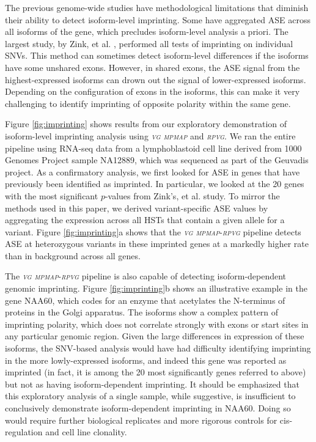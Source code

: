 \documentclass[11pt]{ucthesis}
\newcommand{\tool}[1]{\emph{\textsc{#1}}}
\begin{document}
The previous genome-wide studies have methodological limitations that diminish their ability to detect isoform-level imprinting. Some have aggregated ASE across all isoforms of the gene, which precludes isoform-level analysis a priori\cite{baran2015landscape,babak2015genetic,jadhav2019rna}. The largest study, by Zink, et al. \cite{zink2018insights}, performed all tests of imprinting on individual SNVs. This method can sometimes detect isoform-level differences if the isoforms have some unshared exons. However, in shared exons, the ASE signal from the highest-expressed isoforms can drown out the signal of lower-expressed isoforms. Depending on the configuration of exons in the isoforms, this can make it very challenging to identify imprinting of opposite polarity within the same gene.

Figure \ref{fig:imprinting} shows results from our exploratory demonstration of isoform-level imprinting analysis using \tool{vg mpmap} and \tool{rpvg}. We ran the entire pipeline using RNA-seq data from a lymphoblastoid cell line derived from 1000 Genomes Project sample NA12889, which was sequenced as part of the Geuvadis project\cite{lappalainen2013transcriptome}. As a confirmatory analysis, we first looked for ASE in genes that have previously been identified as imprinted. In particular, we looked at the 20 genes with the most significant $p$-values from Zink's, et al. study\cite{zink2018insights}. To mirror the methods used in this paper, we derived variant-specific ASE values by aggregating the expression across all HSTs that contain a given allele for a variant. Figure \ref{fig:imprinting}a shows that the \tool{vg mpmap}-\tool{rpvg} pipeline detects ASE at heterozygous variants in these imprinted genes at a markedly higher rate than in background across all genes.

The \tool{vg mpmap}-\tool{rpvg} pipeline is also capable of detecting isoform-dependent genomic imprinting. Figure \ref{fig:imprinting}b shows an illustrative example in the gene NAA60, which codes for an enzyme that acetylates the N-terminus of proteins in the Golgi apparatus. The isoforms show a complex pattern of imprinting polarity, which does not correlate strongly with exons or start sites in any particular genomic region. Given the large differences in expression of these isoforms, the SNV-based analysis would have had difficulty identifying imprinting in the more lowly-expressed isoforms, and indeed this gene was reported as imprinted (in fact, it is among the 20 most significantly genes referred to above) but not as having isoform-dependent imprinting\cite{zink2018insights}. It should be emphasized that this exploratory analysis of a single sample, while suggestive, is insufficient to conclusively demonstrate isoform-dependent imprinting in NAA60. Doing so would require further biological replicates and more rigorous controls for cis-regulation and cell line clonality\cite{jadhav2019rna}.
\end{document}
